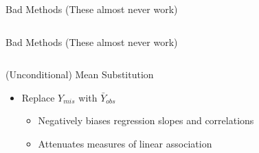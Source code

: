 \documentclass{beamer}\usepackage[]{graphicx}\usepackage[]{color}
\makeatletter
\newenvironment{kframe}{%
 \def\at@end@of@kframe{}%
 \ifinner\ifhmode%
  \def\at@end@of@kframe{\end{minipage}}%
  \begin{minipage}{\columnwidth}%
 \fi\fi%
 \def\FrameCommand##1{\hskip\@totalleftmargin \hskip-\fboxsep
 \colorbox{shadecolor}{##1}\hskip-\fboxsep
     \hskip-\linewidth \hskip-\@totalleftmargin \hskip\columnwidth}%
 \MakeFramed {\advance\hsize-\width
   \@totalleftmargin\z@ \linewidth\hsize
   \@setminipage}}%
 {\par\unskip\endMakeFramed%
 \at@end@of@kframe}
\newenvironment{knitrout}{}{} %
\makeatother
\begin{document}
\begin{frame}{Bad Methods (These almost never work)}
\begin{columns}
\begin{column}{0.5\textwidth}
\begin{knitrout}
{}


\end{knitrout}

\end{column}
\end{columns}

\end{frame}


\begin{frame}{Bad Methods (These almost never work)}
  
  \begin{columns}
    \begin{column}{0.5\textwidth}
      
      (Unconditional) Mean Substitution
      \begin{itemize}
      \item Replace $Y_{mis}$ with $\bar{Y}_{obs}$
        \begin{itemize}
        \item Negatively biases regression slopes and correlations
        \item Attenuates measures of linear association
        \end{itemize}
      \end{itemize}
      
    \end{column}
    \begin{column}{0.5\textwidth}
      
\begin{knitrout}\footnotesize
{}\color{fgcolor}\begin{kframe}


{\ttfamily\noindent\bfseries\color{errorcolor}{Error in FUN(X[[i]], ...): object 'dat2' not found}}\end{kframe}


\end{knitrout}
\end{column}
\end{columns}
\end{frame}
\end{document}
